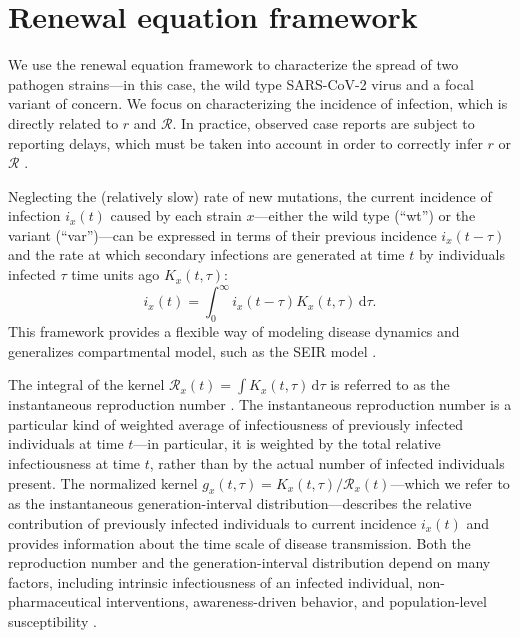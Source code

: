 \documentclass[12pt]{article}
\newcommand{\RR}{\ensuremath{{\mathcal R}}\xspace}
\newcommand{\dd}[1]{\ensuremath{\, \mathrm{d}#1}}
\newcommand{\dtau}{\dd{\tau}}
\begin{document}
\section{Renewal equation framework}

We use the renewal equation framework to characterize the spread of two pathogen strains---in this case, the wild type SARS-CoV-2 virus and a focal variant of concern.
We focus on characterizing the incidence of infection, which is directly related to $r$ and $\RR$.
In practice, observed case reports are subject to reporting delays, which must be taken into account in order to correctly infer $r$ or $\RR$ \citep{goldstein2009reconstructing,gostic2020practical}.

Neglecting the (relatively slow) rate of new mutations, the current incidence of infection $i_x(t)$ caused by each strain $x$---either the wild type (``wt'') or the variant (``var'')---can be expressed in terms of their previous incidence $i_x(t-\tau)$ and the rate at which secondary infections are generated at time $t$ by individuals infected $\tau$ time units ago $K_x(t, \tau)$:
\begin{equation}
i_x(t) = \int_0^\infty i_x(t-\tau) K_x(t, \tau) \dtau.
\end{equation}
This framework provides a flexible way of modeling disease dynamics and generalizes compartmental model, such as the SEIR model \citep{heesterbeek1996concept, diekmann2000mathematical, roberts2004modelling, aldis2005integral, roberts2007model, champredon2018equivalence}.

The integral of the kernel $\RR_x(t) = \int K_x(t, \tau) \dtau$ is referred to as the instantaneous reproduction number \citep{fraser2007estimating}.
The instantaneous reproduction number is a particular kind of weighted average of infectiousness of previously infected individuals at time $t$---in particular, it is weighted by the total relative infectiousness at time $t$, rather than by the actual number of infected individuals present.
The normalized kernel $g_x(t, \tau) = K_x(t, \tau)/\RR_x(t)$---which we refer to as the instantaneous generation-interval distribution---describes the relative contribution of previously infected individuals to current incidence $i_x(t)$ and provides information about the time scale of disease transmission.
Both the reproduction number and the generation-interval distribution depend on many factors, including intrinsic infectiousness of an infected individual, non-pharmaceutical interventions, awareness-driven behavior, and population-level susceptibility \citep{fraser2007estimating}.
\end{document}
